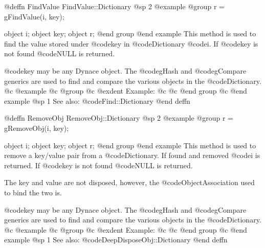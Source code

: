 @deffn {FindValue} FindValue::Dictionary
@sp 2
@example
@group
r = gFindValue(i, key);

object  i;
object  key;
object  r;
@end group
@end example
This method is used to find the value stored under @code{key} in
@code{Dictionary} @code{i}.  If @code{key} is not found @code{NULL} is
returned.

@code{key} may be any Dynace object.  The @code{gHash} and
@code{gCompare} generics are used to find and compare the various
objects in the @code{Dictionary}.
@c @example
@c @group
@c @exdent Example:
@c 
@c @end group
@c @end example
@sp 1
See also:  @code{Find::Dictionary}
@end deffn










@deffn {RemoveObj} RemoveObj::Dictionary
@sp 2
@example
@group
r = gRemoveObj(i, key);

object  i;
object  key;
object  r;
@end group
@end example
This method is used to remove a key/value pair from a @code{Dictionary}.
If found and removed @code{i} is returned.  If @code{key} is not found
@code{NULL} is returned.

The key and value are not disposed, however, the @code{ObjectAssociation} used
to bind the two is.

@code{key} may be any Dynace object.  The @code{gHash} and
@code{gCompare} generics are used to find and compare the various
objects in the @code{Dictionary}.
@c @example
@c @group
@c @exdent Example:
@c 
@c @end group
@c @end example
@sp 1
See also:  @code{DeepDisposeObj::Dictionary}
@end deffn






